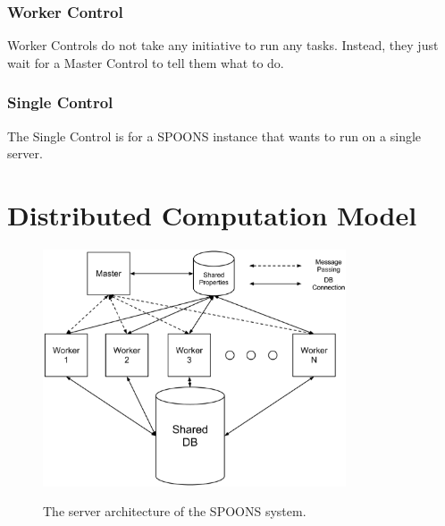 \documentclass[12pt]{ucthesis}
\newcommand{\captionfonts}{\small\bf\ssp}
\begin{document}
\subsection{Worker Control}
\label{arch-worker-control}
Worker Controls do not take any initiative to run any tasks. Instead, they just wait for a Master Control to tell them what to do.

\subsection{Single Control}
\label{arch-single-control}
The Single Control is for a SPOONS instance that wants to run on a single server.

\chapter{Distributed Computation Model}
\label{arch-dist}

\begin{figure}
   \begin{center}
      \includegraphics[width=0.8\textwidth]{images/SPOONS_Server_Architecture.eps}
      \captionfonts
      \caption[SPOONS Server Architecture]{The server architecture of the SPOONS system.}
      \label{fig:serverArch}
   \end{center}
\end{figure}
\end{document}
